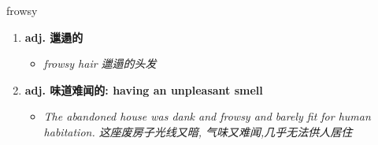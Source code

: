 
\begin{frame}
{\huge frowsy}
\begin{center}
\begin{enumerate}\Large
  \item \textbf{adj. 邋遢的}
  \begin{itemize}
    \item \em{\Large{frowsy hair 邋遢的头发}}
  \end{itemize}
  \item \textbf{adj. 味道难闻的: having an unpleasant smell}
  \begin{itemize}
    \item \em{\Large{The abandoned house was dank and frowsy and barely fit for human habitation. 这座废房子光线又暗, 气味又难闻,几乎无法供人居住}}
  \end{itemize}
\end{enumerate}
\end{center}
\end{frame}
